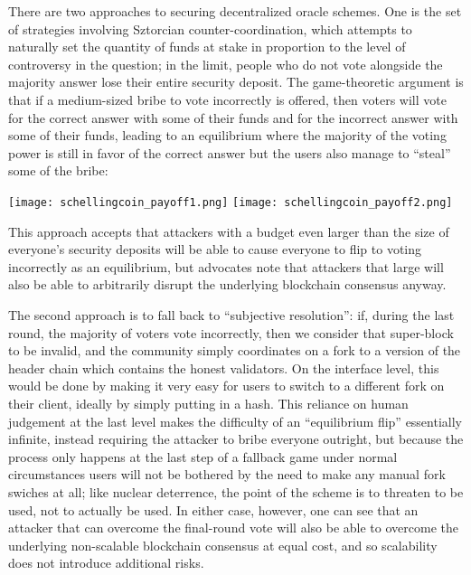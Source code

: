 \documentclass[11pt,a4paper]{report}
\theoremstyle{plain}
\theoremstyle{definition}
\theoremstyle{remark}
\begin{document}
There are two approaches to securing decentralized oracle schemes. One is the set of strategies involving Sztorcian counter-coordination, which attempts to naturally set the quantity of funds at stake in proportion to the level of controversy in the question; in the limit, people who do not vote alongside the majority answer lose their entire security deposit. The game-theoretic argument is that if a medium-sized bribe to vote incorrectly is offered, then voters will vote for the correct answer with some of their funds and for the incorrect answer with some of their funds, leading to an equilibrium where the majority of the voting power is still in favor of the correct answer but the users also manage to ``steal'' some of the bribe:

\begin{center}
\texttt{[image: schellingcoin\_payoff1.png]}
\texttt{[image: schellingcoin\_payoff2.png]}
\end{center}


This approach accepts that attackers with a budget even larger than the size of everyone's security deposits will be able to cause everyone to flip to voting incorrectly as an equilibrium, but advocates note that attackers that large will also be able to arbitrarily disrupt the underlying blockchain consensus anyway.

The second approach is to fall back to ``subjective resolution'': if, during the last round, the majority of voters vote incorrectly, then we consider that super-block to be invalid, and the community simply coordinates on a fork to a version of the header chain which contains the honest validators. On the interface level, this would be done by making it very easy for users to switch to a different fork on their client, ideally by simply putting in a hash. This reliance on human judgement at the last level makes the difficulty of an ``equilibrium flip'' essentially infinite, instead requiring the attacker to bribe everyone outright, but because the process only happens at the last step of a fallback game under normal circumstances users will not be bothered by the need to make any manual fork swiches at all; like nuclear deterrence, the point of the scheme is to threaten to be used, not to actually be used. In either case, however, one can see that an attacker that can overcome the final-round vote will also be able to overcome the underlying non-scalable blockchain consensus at equal cost, and so scalability does not introduce additional risks.
\end{document}
